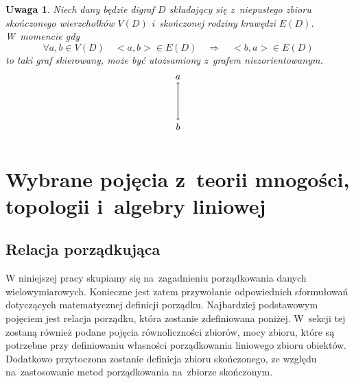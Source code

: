 \documentclass[12pt,a4paper]{report}
\newtheorem{definition}[theorem]{Definicja}
\newtheorem{uwaga}{Uwaga}
\begin{document}
\begin{uwaga}
Niech dany będzie digraf $D$ składający się z~niepustego zbioru skończonego wierzchołków $V(D)$ i~skończonej rodziny krawędzi $E(D)$. W~momencie gdy $$\forall{a,b} \in V(D) \quad  <a,b>  \in E(D) \quad \Rightarrow \quad <b,a>  \in E(D)$$ to taki graf skierowany, może być utożsamiony z~grafem niezorientowanym. 
$$
\begin{tikzpicture}[scale=.7]
\draw [->] (0,-2) --(0,0) ;
 \draw node(a) at (0,0.25) {$a$};
 \draw [->] (0,0) --(0,-2); 
 \draw node (b) at (0, -2.35) {$b$};
\end{tikzpicture}
$$

\end{uwaga}






\section{Wybrane pojęcia z~teorii mnogości, topologii i~algebry liniowej}\label{teoria mnogosci}
\subsection{Relacja porządkująca}


W niniejszej pracy skupiamy się na~zagadnieniu porządkowania danych wielowymiarowych. Konieczne jest zatem przywołanie odpowiednich sformułowań dotyczących matematycznej definicji porządku. Najbardziej podstawowym pojęciem jest relacja porządku, która zostanie zdefiniowana poniżej. W~sekcji tej zostaną również podane pojęcia równoliczności zbiorów, mocy zbioru, które są potrzebne przy definiowaniu własności porządkowania liniowego zbioru obiektów. Dodatkowo przytoczona zostanie definicja zbioru skończonego, ze względu na~zastosowanie metod porządkowania na~zbiorze skończonym.

\end{document}
